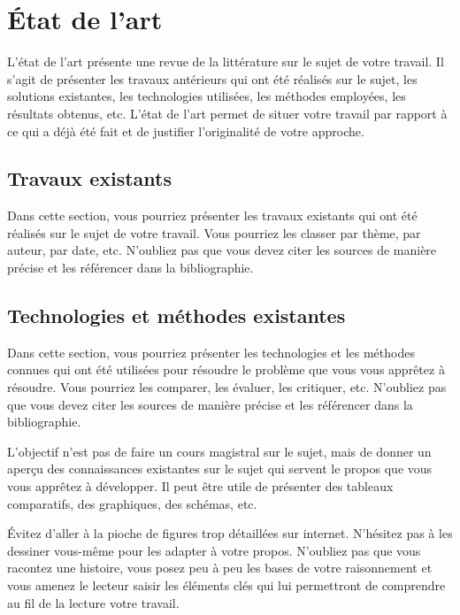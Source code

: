 \chapter{État de l'art}

L'état de l'art présente une revue de la littérature sur le sujet de votre travail. Il s'agit de présenter les travaux antérieurs qui ont été réalisés sur le sujet, les solutions existantes, les technologies utilisées, les méthodes employées, les résultats obtenus, etc. L'état de l'art permet de situer votre travail par rapport à ce qui a déjà été fait et de justifier l'originalité de votre approche.

\section{Travaux existants}

Dans cette section, vous pourriez présenter les travaux existants qui ont été réalisés sur le sujet de votre travail. Vous pourriez les classer par thème, par auteur, par date, etc. N'oubliez pas que vous devez citer les sources de manière précise et les référencer dans la bibliographie.

\section{Technologies et méthodes existantes}

Dans cette section, vous pourriez présenter les technologies et les méthodes connues qui ont été utilisées pour résoudre le problème que vous vous apprêtez à résoudre. Vous pourriez les comparer, les évaluer, les critiquer, etc. N'oubliez pas que vous devez citer les sources de manière précise et les référencer dans la bibliographie.

L'objectif n'est pas de faire un cours magistral sur le sujet, mais de donner un aperçu des connaissances existantes sur le sujet qui servent le propos que vous vous apprêtez à développer. Il peut être utile de présenter des tableaux comparatifs, des graphiques, des schémas, etc.

Évitez d'aller à la pioche de figures trop détaillées sur internet. N'hésitez pas à les dessiner vous-même pour les adapter à votre propos. N'oubliez pas que vous racontez une histoire, vous posez peu à peu les bases de votre raisonnement et vous amenez le lecteur saisir les éléments clés qui lui permettront de comprendre au fil de la lecture votre travail.
